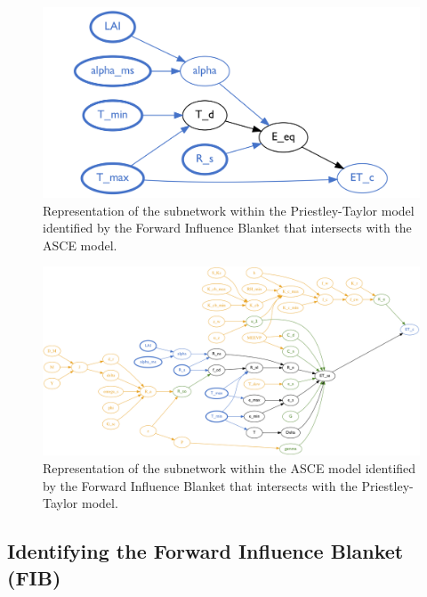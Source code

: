 \documentclass[article, 12pt, oneside]{memoir}
\begin{document}
\begin{figure}
\centering
\includegraphics{figs/full-pt-cmb.png}
\caption{Representation of the subnetwork within the Priestley-Taylor
model identified by the Forward Influence Blanket that intersects with
the ASCE model.\label{fig:pt}}
\end{figure}


\begin{figure}
\centering
\includegraphics{figs/full-asce-cmb.png}
\caption{Representation of the subnetwork within the ASCE model
identified by the Forward Influence Blanket that intersects with the
Priestley-Taylor model.\label{fig:asce}}
\end{figure}


\hypertarget{identifying-the-forward-influence-blanket-fib}{%
\subsection{Identifying the Forward Influence Blanket
(FIB)}\label{identifying-the-forward-influence-blanket-fib}}
\end{document}
